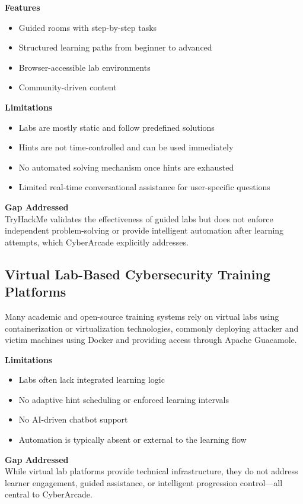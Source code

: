 \documentclass[12pt,a4paper]{report}
\begin{document}
\textbf{Features}
\begin{itemize}
  \item Guided rooms with step-by-step tasks
  \item Structured learning paths from beginner to advanced
  \item Browser-accessible lab environments
  \item Community-driven content
\end{itemize}

\textbf{Limitations}
\begin{itemize}
  \item Labs are mostly static and follow predefined solutions
  \item Hints are not time-controlled and can be used immediately
  \item No automated solving mechanism once hints are exhausted
  \item Limited real-time conversational assistance for user-specific questions
\end{itemize}

\textbf{Gap Addressed}\\
TryHackMe validates the effectiveness of guided labs but does not enforce independent problem-solving
or provide intelligent automation after learning attempts, which CyberArcade explicitly addresses.

\subsection{Virtual Lab-Based Cybersecurity Training Platforms}

Many academic and open-source training systems rely on virtual labs using containerization or
virtualization technologies, commonly deploying attacker and victim machines using Docker and providing
access through Apache Guacamole.

\textbf{Limitations}
\begin{itemize}
  \item Labs often lack integrated learning logic
  \item No adaptive hint scheduling or enforced learning intervals
  \item No AI-driven chatbot support
  \item Automation is typically absent or external to the learning flow
\end{itemize}

\textbf{Gap Addressed}\\
While virtual lab platforms provide technical infrastructure, they do not address learner engagement,
guided assistance, or intelligent progression control---all central to CyberArcade.
\end{document}
